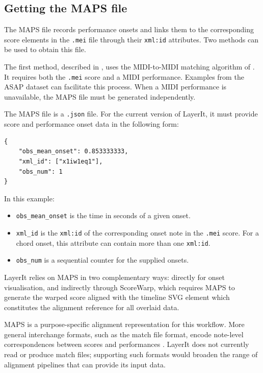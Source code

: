 \subsection{Getting the MAPS file}
The MAPS file records performance onsets and links them to the corresponding score elements in the \texttt{.mei} file through their \texttt{xml:id} attributes. Two methods can be used to obtain this file.

The first method, described in \cite{goeblLetsScoreWarpAgain2025a}, uses the MIDI-to-MIDI matching algorithm of \cite{nakamuraPERFORMANCEERRORDETECTION}. It requires both the \texttt{.mei} score and a MIDI performance. Examples from the ASAP dataset \cite{peterAutomaticNoteLevelScoretoPerformance2023} can facilitate this process. When a MIDI performance is unavailable, the MAPS file must be generated independently.

The MAPS file is a \texttt{.json} file. For the current version of LayerIt, it must provide score and performance onset data in the following form:

\begin{lstlisting}[caption={Minimal structure of the MAPS.json file to work with LayerIt and ScoreWarp},label={lst:simple-MAPS-example}]
{
    "obs_mean_onset": 0.853333333,
    "xml_id": ["x1iw1eq1"],
    "obs_num": 1
}
\end{lstlisting}

\noindent In this example:

\begin{itemize}
    \item \texttt{obs\_mean\_onset} is the time in seconds of a given onset.
    \item \texttt{xml\_id} is the \texttt{xml:id} of the corresponding onset note in the \texttt{.mei} score. For a chord onset, this attribute can contain more than one \texttt{xml:id}.
    \item \texttt{obs\_num} is a sequential counter for the supplied onsets.
\end{itemize} 

\noindent LayerIt relies on MAPS in two complementary ways: directly for onset visualisation, and indirectly through ScoreWarp, which requires MAPS to generate the warped score aligned with the timeline SVG element which constitutes the alignment reference for all overlaid data.

MAPS is a purpose-specific alignment representation for this workflow. More general interchange formats, such as the match file format, encode note-level correspondences between scores and performances \cite{foscarinMatchFileFormat2022}. LayerIt does not currently read or produce match files; supporting such formats would broaden the range of alignment pipelines that can provide its input data.

